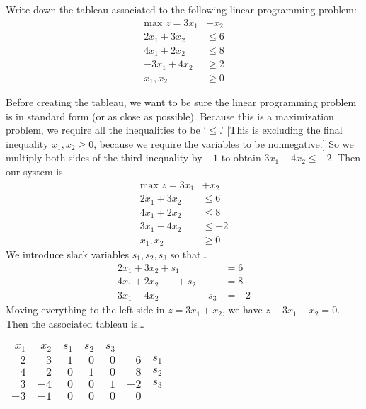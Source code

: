 \documentclass[11pt,letterpaper]{article}
\begin{document}

 Write down the tableau associated to the following linear programming problem:
	\[
	\begin{aligned}
	\text{max }  z= 3x_1 &+ x_2 \\
	2x_1 + 3x_2&\leq 6 \\
	4x_1 + 2x_2&\leq 8 \\
	-3x_1 + 4x_2&\geq 2 \\
	x_1, x_2&\geq 0
	\end{aligned}
	\] \pspace

\sol Before creating the tableau, we want to be sure the linear programming problem is in standard form (or as close as possible). Because this is a maximization problem, we require all the inequalities to be `$\leq$.' [This is excluding the final inequality $x_1, x_2 \geq 0$, because we require the variables to be nonnegative.] So we multiply both sides of the third inequality by $-1$ to obtain $3x_1 - 4x_2 \leq - 2$. Then our system is
	\[
	\begin{aligned}
	\text{max }  z= 3x_1 &+ x_2 \\
	2x_1 + 3x_2&\leq 6 \\
	4x_1 + 2x_2&\leq 8 \\
	3x_1 - 4x_2&\leq -2 \\
	x_1, x_2&\geq 0
	\end{aligned}
	\] 
We introduce slack variables $s_1, s_2, s_3$ so that\dots
	\[
	\begin{aligned}	
	2x_1 + 3x_2 + s_1 \phantom{+ s_2 + s_3}&= 6 \\
	4x_1 + 2x_2 \phantom{+ s_1} + s_2 \phantom{+ s_3}&= 8 \\
	3x_1 - 4x_2 \phantom{+ s_1 + s_2} + s _3&= -2
	\end{aligned}
	\] 
Moving everything to the left side in $z= 3x_1 + x_2$, we have $z - 3x_1 - x_2= 0$. Then the associated tableau is\dots
	\begin{table}[!ht]
	\centering
	\begin{tabular}{rrrrrr r}
	{\small $x_1$} & {\small $x_2$} & {\small $s_1$} & {\small $s_2$} & {\small $s_3$} \\
	$2$ & $3$ & $1$ & $0$ & \multicolumn{1}{r|}{$0$} & $6$ & {\small $s_1$} \\
	$4$ & $2$ & $0$ & $1$ & \multicolumn{1}{r|}{$0$} & $8$ & {\small $s_2$} \\
	$3$ & $-4$ & $0$ & $0$ & \multicolumn{1}{r|}{$1$} & $-2$ & {\small $s_3$}\\ \cline{1-6}
	$-3$ & $-1$ & $0$ & $0$ & \multicolumn{1}{r|}{$0$} & $0$ 
	\end{tabular}
	\end{table}
\end{document}
